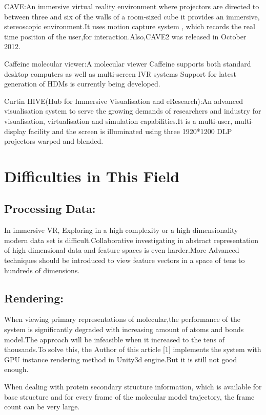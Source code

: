 \documentclass[10pt,twocolumn,letterpaper]{article}
\begin{document}
CAVE:An immersive virtual reality environment where projectors are directed to between three and six of the walls of a room-sized cube it provides an immersive, stereoscopic environment.It uses motion capture system , which records the real time position of the user,for interaction.Also,CAVE2 was released in October 2012.

\setlength{\parindent}{1pc}
Caffeine molecular viewer:A molecular viewer Caffeine supports both standard desktop computers as well as multi-screen IVR systems Support for latest generation of HDMs is currently being developed.

\setlength{\parindent}{1pc}
Curtin HIVE(Hub for Immersive Visualisation and eResearch):An advanced visualisation system to serve the growing demands of researchers and industry for visualisation, virtualisation and simulation capabilities.It is a multi-user, multi-display facility and the screen is illuminated using three 1920*1200 DLP projectors warped and blended.

\section{Difficulties in This Field}
\subsection{Processing Data:}In immersive VR, Exploring in a high complexity or a high dimensionality modern data set is difficult.Collaborative investigating in abstract representation of high-dimensional data and feature spaces is even harder.More Advanced techniques should be introduced to view feature vectors in a space of tens to hundreds of dimensions.

\setlength{\parindent}{1pc}

\subsection{Rendering:}
When viewing primary representations of molecular,the performance of the system is significantly degraded with increasing amount of atoms and bonds model.The approach will be infeasible when it increased to the tens of thousands.To solve this, the Author of this article [1] implements the system with GPU instance rendering method in Unity3d engine.But it is still not good enough.

\setlength{\parindent}{1pc}
When dealing with protein secondary structure information, which is available for base structure and for every frame of the molecular model trajectory, the frame count can be very large.
\end{document}
